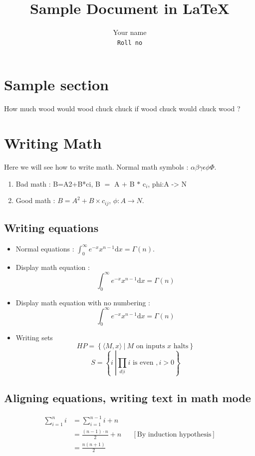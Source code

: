\documentclass[10pt,a4paper]{article}
\title{Sample Document in \LaTeX}
\author{Your name \\  {\tt Roll no}}
\date{}
\begin{document}
\maketitle


\section{Sample section}
How much wood would wood chuck chuck if wood chuck would chuck wood ?


\section{Writing Math}
Here we will see how to write math. Normal math symbols : 
$\alpha\beta\gamma\epsilon\phi\Phi $.
\begin{enumerate}
\item Bad math : B=A2+B*ci, B $=$ A $+$ B $*$ c$_i$, phi:A -> N
\item Good math : $B=A^2 +B \times c_{ij}$, $\phi: A \to N$.
\end{enumerate}


\subsection{Writing equations}
\begin{itemize}
\item Normal equations : 
	$\int_0^\infty e^{-x} x^{n-1} \mathrm{d}x = \Gamma(n)$.
\item Display math equation : 
	\begin{equation}
	\int_0^\infty e^{-x} x^{n-1} \mathrm{d}x = \Gamma(n)
	\end{equation}
\item Display math equation with no numbering : 
	\begin{equation*}
	\int_0^\infty e^{-x} x^{n-1} \mathrm{d}x = \Gamma(n)
	\end{equation*}
\item Writing sets
	\begin{equation}
	HP = \left \{ \langle M,x \rangle ~|~ \text{$M$ on inputs $x$ halts}  \right \}
	\end{equation}
	\begin{equation}
	S =  \left \{ i ~\left |  \prod_{d | i} i \text{ is even }, i > 0 \right . \right \}
	\end{equation}
\end{itemize}

\subsection{Aligning equations, writing text in math mode}
\begin{align*}
\sum_{i=1}^n i & = \sum_{i=1}^{n-1} i + n \\
			   & = \frac{(n-1)\cdot n}{2} + n && [\text{By induction hypothesis}]\\
			   & = \frac{n(n+1)}{2}
\end{align*}
\end{document}

